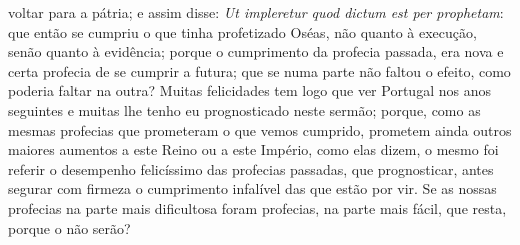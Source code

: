 voltar para a pátria; e assim disse: \emph{Ut impleretur quod dictum est
per prophetam}: que então se cumpriu o que tinha profetizado Oséas, não
quanto à execução, senão quanto à evidência; porque o cumprimento da
profecia passada, era nova e certa profecia de se cumprir a futura; que
se numa parte não faltou o efeito, como poderia faltar na outra? Muitas
felicidades tem logo que ver Portugal nos anos seguintes e muitas lhe
tenho eu prognosticado neste sermão; porque, como as mesmas profecias
que prometeram o que vemos cumprido, prometem ainda outros maiores
aumentos a este Reino ou a este Império, como elas dizem, o mesmo foi
referir o desempenho felicíssimo das profecias passadas, que
prognosticar, antes segurar com firmeza o cumprimento infalível das que
estão por vir. Se as nossas profecias na parte mais dificultosa foram
profecias, na parte mais fácil, que resta, porque o não serão?

